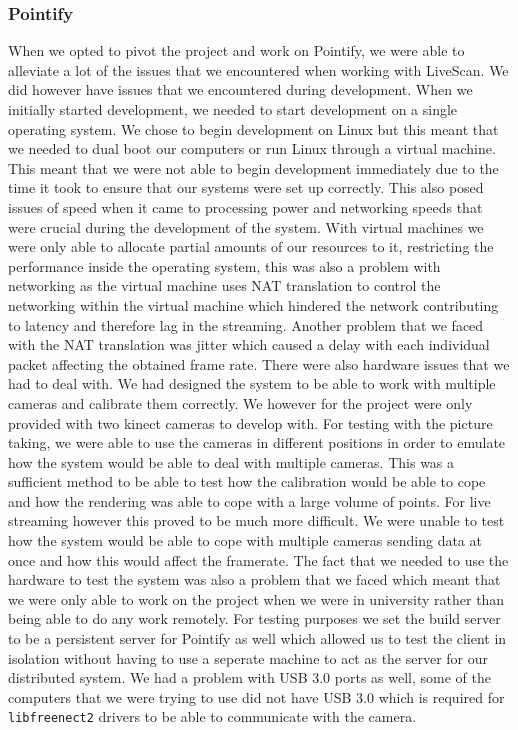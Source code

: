 \documentclass{article}
\begin{document}
\subsubsection{Pointify}
When we opted to pivot the project and work on Pointify, we were able to alleviate a lot of the issues that we encountered when working with LiveScan. We did however have issues that we encountered during development. When we initially started development, we needed to start development on a single operating system. We chose to begin development on Linux but this meant that we needed to dual boot our computers or run Linux through a virtual machine. This meant that we were not able to begin development immediately due to the time it took to ensure that our systems were set up correctly. This also posed issues of speed when it came to processing power and networking speeds that were crucial during the development of the system. With virtual machines we were only able to allocate partial amounts of our resources to it, restricting the performance inside the operating system, this was also a problem with networking as the virtual machine uses NAT translation to control the networking within the virtual machine which hindered the network contributing to latency and therefore lag in the streaming. Another problem that we faced with the NAT translation was jitter which caused a delay with each individual packet affecting the obtained frame rate. 
\newpage
There were also hardware issues that we had to deal with. We had designed the system to be able to work with multiple cameras and calibrate them correctly. We however for the project were only provided with two kinect cameras to develop with. For testing with the picture taking, we were able to use the cameras in different positions in order to emulate how the system would be able to deal with multiple cameras. This was a sufficient method to be able to test how the calibration would be able to cope and how the rendering was able to cope with a large volume of points. For live streaming however this proved to be much more difficult. We were unable to test how the system would be able to cope with multiple cameras sending data at once and how this would affect the framerate. The fact that we needed to use the hardware to test the system was also a problem that we faced which meant that we were only able to work on the project when we were in university rather than being able to do any work remotely. For testing purposes we set the build server to be a persistent server for Pointify as well which allowed us to test the client in isolation without having to use a seperate machine to act as the server for our distributed system. We had a problem with USB 3.0 ports as well, some of the computers that we were trying to use did not have USB 3.0 which is required for \texttt{libfreenect2} drivers to be able to communicate with the camera.
\newpage
\end{document}
